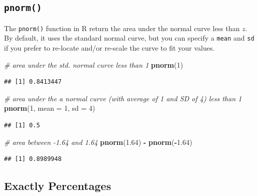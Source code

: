 \documentclass[]{book}
\newenvironment{Shaded}{\begin{snugshade}}{\end{snugshade}}
\newcommand{\CommentTok}[1]{\textcolor[rgb]{0.56,0.35,0.01}{\textit{#1}}}
\newcommand{\DataTypeTok}[1]{\textcolor[rgb]{0.13,0.29,0.53}{#1}}
\newcommand{\DecValTok}[1]{\textcolor[rgb]{0.00,0.00,0.81}{#1}}
\newcommand{\FloatTok}[1]{\textcolor[rgb]{0.00,0.00,0.81}{#1}}
\newcommand{\KeywordTok}[1]{\textcolor[rgb]{0.13,0.29,0.53}{\textbf{#1}}}
\newcommand{\NormalTok}[1]{#1}
\newcommand{\OperatorTok}[1]{\textcolor[rgb]{0.81,0.36,0.00}{\textbf{#1}}}
\newcommand{\StringTok}[1]{\textcolor[rgb]{0.31,0.60,0.02}{#1}}
\begin{document}
\hypertarget{pnorm}{%
\subsection{\texorpdfstring{\texttt{pnorm()}}{pnorm()}}\label{pnorm}}

The \texttt{pnorm()} function in R return the area under the normal curve less than \(z\). By default, it uses the standard normal curve, but you can specify a \texttt{mean} and \texttt{sd} if you prefer to re-locate and/or re-scale the curve to fit your values.

\begin{Shaded}
\begin{Highlighting}[]
\CommentTok{# area under the std. normal curve less than 1}
\KeywordTok{pnorm}\NormalTok{(}\DecValTok{1}\NormalTok{)}
\end{Highlighting}
\end{Shaded}

\begin{verbatim}
## [1] 0.8413447
\end{verbatim}

\begin{Shaded}
\begin{Highlighting}[]
\CommentTok{# area under the a normal curve (with average of 1 and SD of 4) less than 1}
\KeywordTok{pnorm}\NormalTok{(}\DecValTok{1}\NormalTok{, }\DataTypeTok{mean =} \DecValTok{1}\NormalTok{, }\DataTypeTok{sd =} \DecValTok{4}\NormalTok{)}
\end{Highlighting}
\end{Shaded}

\begin{verbatim}
## [1] 0.5
\end{verbatim}

\begin{Shaded}
\begin{Highlighting}[]
\CommentTok{# area between -1.64 and 1.64}
\KeywordTok{pnorm}\NormalTok{(}\FloatTok{1.64}\NormalTok{) }\OperatorTok{-}\StringTok{ }\KeywordTok{pnorm}\NormalTok{(}\OperatorTok{-}\FloatTok{1.64}\NormalTok{)}
\end{Highlighting}
\end{Shaded}

\begin{verbatim}
## [1] 0.8989948
\end{verbatim}

\hypertarget{exactly-percentages}{%
\subsection{Exactly Percentages}\label{exactly-percentages}}
\end{document}
